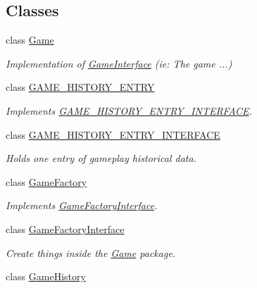 \subsection*{Classes}
\begin{DoxyCompactItemize}
\item 
class \hyperlink{classAsteroids_1_1Domain_1_1Game_1_1Game}{Game}
\begin{DoxyCompactList}\small\item\em Implementation of \hyperlink{classAsteroids_1_1Domain_1_1Game_1_1GameInterface}{Game\+Interface} (ie\+: The game ...) \end{DoxyCompactList}\item 
class \hyperlink{classAsteroids_1_1Domain_1_1Game_1_1GAME__HISTORY__ENTRY}{G\+A\+M\+E\+\_\+\+H\+I\+S\+T\+O\+R\+Y\+\_\+\+E\+N\+T\+RY}
\begin{DoxyCompactList}\small\item\em Implements \hyperlink{classAsteroids_1_1Domain_1_1Game_1_1GAME__HISTORY__ENTRY__INTERFACE}{G\+A\+M\+E\+\_\+\+H\+I\+S\+T\+O\+R\+Y\+\_\+\+E\+N\+T\+R\+Y\+\_\+\+I\+N\+T\+E\+R\+F\+A\+CE}. \end{DoxyCompactList}\item 
class \hyperlink{classAsteroids_1_1Domain_1_1Game_1_1GAME__HISTORY__ENTRY__INTERFACE}{G\+A\+M\+E\+\_\+\+H\+I\+S\+T\+O\+R\+Y\+\_\+\+E\+N\+T\+R\+Y\+\_\+\+I\+N\+T\+E\+R\+F\+A\+CE}
\begin{DoxyCompactList}\small\item\em Holds one entry of gameplay historical data. \end{DoxyCompactList}\item 
class \hyperlink{classAsteroids_1_1Domain_1_1Game_1_1GameFactory}{Game\+Factory}
\begin{DoxyCompactList}\small\item\em Implements \hyperlink{classAsteroids_1_1Domain_1_1Game_1_1GameFactoryInterface}{Game\+Factory\+Interface}. \end{DoxyCompactList}\item 
class \hyperlink{classAsteroids_1_1Domain_1_1Game_1_1GameFactoryInterface}{Game\+Factory\+Interface}
\begin{DoxyCompactList}\small\item\em Create things inside the \hyperlink{classAsteroids_1_1Domain_1_1Game_1_1Game}{Game} package. \end{DoxyCompactList}\item 
class \hyperlink{classAsteroids_1_1Domain_1_1Game_1_1GameHistory}{Game\+History}

\end{DoxyCompactItemize}
